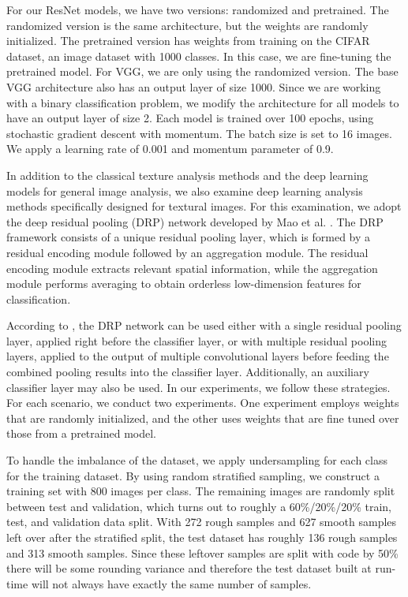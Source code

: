 \documentclass{aci}
\numberwithin{equation}{section}
\begin{document}
For our ResNet models, we have two versions: randomized and pretrained. The
randomized version is the same architecture, but the weights are randomly
initialized. The pretrained version has weights from training on the CIFAR
dataset, an image dataset with 1000 classes. In this case, we are fine-tuning
the pretrained model. For VGG, we are only using the randomized version. The
base VGG architecture also has an output layer of size 1000. Since we are
working with a binary classification problem, we modify the architecture for all
models to have an output layer of size 2. Each model is trained over 100 epochs,
using stochastic gradient descent with momentum. The batch size is set to 16
images. We apply a learning rate of 0.001 and momentum parameter of 0.9.


In addition to the classical texture analysis methods and the deep learning
models for general image analysis, we also examine deep learning analysis
methods specifically designed for textural images. For this examination, we
adopt the deep residual pooling (DRP) network developed by Mao et al.
\cite{mao_deep_2021}. The DRP framework consists of a unique residual pooling
layer, which is formed by a residual encoding module followed by an aggregation
module. The residual encoding module extracts relevant spatial information,
while the aggregation module performs averaging to obtain orderless
low-dimension features for classification.

According to \cite{mao_deep_2021}, the DRP network can be used either with a
single residual pooling layer, applied right before the classifier layer, or
with multiple residual pooling layers, applied to the output of multiple
convolutional layers before feeding the combined pooling results into the
classifier layer. Additionally, an auxiliary classifier layer may also be used.
In our experiments, we follow these strategies. For each scenario, we conduct
two experiments. One experiment employs weights that are randomly initialized,
and the other uses weights that are fine tuned over those from a pretrained
model.

To handle the imbalance of the dataset, we apply undersampling for each class for
the training dataset. By using random stratified sampling, we construct a
training set with 800 images per class. The remaining images are randomly split
between test and validation, which turns out to roughly a 60\%/20\%/20\% train,
test, and validation data split. With 272 rough samples and 627 smooth samples
left over after the stratified split, the test dataset has roughly 136 rough
samples and 313 smooth samples. Since these leftover samples are split with code
by 50\% there will be some rounding variance and therefore the test dataset
built at run-time will not always have exactly the same number of samples.
\end{document}
